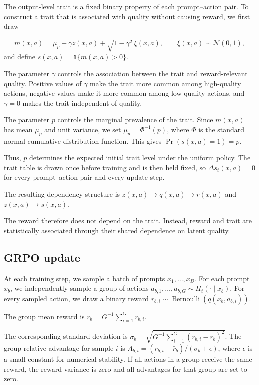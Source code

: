 The output-level trait is a fixed binary property of each prompt--action pair. To construct a trait that is associated with quality without causing reward, we first draw

\begin{equation*}
    m(x,a)
    =
    \mu_p
    +
    \gamma z(x,a)
    +
    \sqrt{1-\gamma^2}\,\xi(x,a),
    \qquad
    \xi(x,a)\sim\mathcal{N}(0,1),
\end{equation*}
and define $s(x,a)=\mathds{1}\{m(x,a)>0\}$.

The parameter $\gamma$ controls the association between the trait and reward-relevant quality. Positive values of $\gamma$ make the trait more common among high-quality actions, negative values make it more common among low-quality actions, and $\gamma=0$ makes the trait independent of quality.

The parameter $p$ controls the marginal prevalence of the trait. Since $m(x,a)$ has mean $\mu_p$ and unit variance, we set $\mu_p=\Phi^{-1}(p)$, where $\Phi$ is the standard normal cumulative distribution function. This gives $\Pr\!\left(s(x,a)=1\right)=p$.

Thus, $p$ determines the expected initial trait level under the uniform policy. The trait table is drawn once before training and is then held fixed, so $\Delta s_t(x,a)=0$ for every prompt--action pair and every update step.

The resulting dependency structure is $z(x,a)\longrightarrow q(x,a)\longrightarrow r(x,a)$ and $z(x,a)\longrightarrow s(x,a)$.

The reward therefore does not depend on the trait. Instead, reward and trait are statistically associated through their shared dependence on latent quality.

\subsection{GRPO update}

At each training step, we sample a batch of prompts $x_1,\ldots,x_B$. For each prompt $x_b$, we independently sample a group of actions $a_{b,1},\ldots,a_{b,G}\sim\Pi_t(\cdot\mid x_b)$. For every sampled action, we draw a binary reward $r_{b,i}\sim\operatorname{Bernoulli}\!\left(q(x_b,a_{b,i})\right)$.

The group mean reward is $\bar r_b=G^{-1}\sum_{i=1}^{G}r_{b,i}$.

The corresponding standard deviation is ${\sigma_b=\sqrt{G^{-1}\sum_{i=1}^{G}\left(r_{b,i}-\bar r_b\right)^2}}$. The group-relative advantage for sample $i$ is $A_{b,i}=(r_{b,i}-\bar r_b)/(\sigma_b+\epsilon)$, where $\epsilon$ is a small constant for numerical stability. If all actions in a group receive the same reward, the reward variance is zero and all advantages for that group are set to zero.

